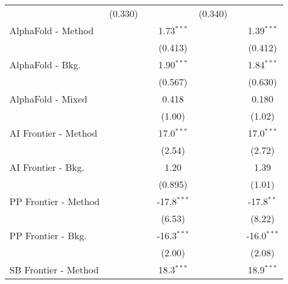 \begin{tabular}{lcccccc}
                                  & (0.330)        &               &                & (0.340)       &                &   \\   
   AlphaFold - Method             &                &               & 1.73$^{***}$   &               &                & 1.39$^{***}$\\   
                                  &                &               & (0.413)        &               &                & (0.412)\\   
   AlphaFold - Bkg.               &                &               & 1.90$^{***}$   &               &                & 1.84$^{***}$\\   
                                  &                &               & (0.567)        &               &                & (0.630)\\   
   AlphaFold - Mixed              &                &               & 0.418          &               &                & 0.180\\   
                                  &                &               & (1.00)         &               &                & (1.02)\\   
   AI Frontier - Method           &                &               & 17.0$^{***}$   &               &                & 17.0$^{***}$\\   
                                  &                &               & (2.54)         &               &                & (2.72)\\   
   AI Frontier - Bkg.             &                &               & 1.20           &               &                & 1.39\\   
                                  &                &               & (0.895)        &               &                & (1.01)\\   
   PP Frontier - Method           &                &               & -17.8$^{***}$  &               &                & -17.8$^{**}$\\   
                                  &                &               & (6.53)         &               &                & (8.22)\\   
   PP Frontier - Bkg.             &                &               & -16.3$^{***}$  &               &                & -16.0$^{***}$\\   
                                  &                &               & (2.00)         &               &                & (2.08)\\   
   SB Frontier - Method           &                &               & 18.3$^{***}$   &               &                & 18.9$^{***}$\\   

\end{tabular}
